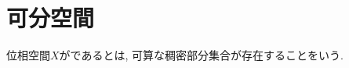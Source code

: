 \documentclass[uplatex, dvipdfmx, a4paper, 12pt, class=jsbook, crop=false]{standalone}
\begin{document}
\section{可分空間}
\label{sec:separable-spaces}

\begin{definition}
	位相空間$ X $がであるとは,
	可算な稠密部分集合が存在することをいう.
\end{definition}
\end{document}

